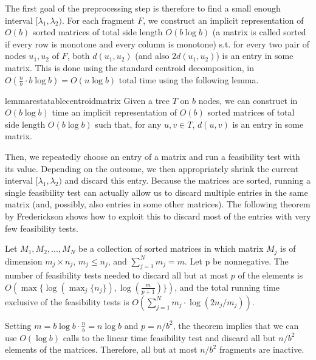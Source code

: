 \documentclass[a4paper,UKenglish]{lipics-v2016}
\theoremstyle{plain}
\begin{document}
The first goal of the preprocessing step is therefore to find a small enough interval $[\lambda_1,\lambda_2)$.
For each fragment $F$, we construct an implicit representation of $O(b)$ sorted matrices of total side length $O(b\log b)$
(a matrix is called sorted if every row is monotone and every column is monotone) s.t. for every two pair of nodes $u_1,u_2$ of $F$, both $d(u_1,u_2)$ (and also $2d(u_1,u_2)$) is an entry in some matrix. This is done using the standard centroid 
decomposition, in $O(\frac n b \cdot b\log b)=O(n\log b)$ total time using the following lemma. 
\begin{restatable}{lemmarestatable}{centroidmatrix}
Given a tree $T$ on $b$ nodes, we can construct in $O(b\log b)$ time an implicit representation of $O(b)$ sorted matrices of total
side length $O(b\log b)$ such that, for any $u,v\in T$, $d(u,v)$ is an entry in some matrix.
\end{restatable}
Then, we repeatedly choose an entry of a matrix and run a feasibility test with its value.  %
Depending on the outcome, we then appropriately shrink the current interval $[\lambda_{1},\lambda_{2})$ and discard this entry.
Because the matrices are sorted, running a single feasibility test can actually allow us to discard multiple entries in the same matrix
(and, possibly, also entries in some other matrices). The following theorem by Frederickson shows how to exploit this to discard most
of the entries with very few feasibility tests.

\begin{theorem}\label{Frederickson's theorem}
Let  ${M_1, M_2, . . . , M_N}$ be a collection of sorted matrices in which matrix $M_j$ is of dimension $m_j \times n_j$, $m_j \leq n_j$, and $\sum_{j=1}^{N} m_j = m$.
Let p be nonnegative. The number of feasibility tests needed to discard all but at most $p$ of the elements is $O(\max \lbrace \log(\max_{j} \lbrace n_j \rbrace), \log(\frac{m}{p+1}) \rbrace)$, and the total running time exclusive of the feasibility tests is $O(\sum_{j=1}^{N} m_j \cdot \log (2n_j/m_j))$.
\end{theorem}

Setting $m=b \log b \cdot \frac{n}{b} = n \log b$ and $p=n/b^2$, the theorem implies that we can use $O(\log b)$ calls to the linear time feasibility test and discard all but $n/b^2$ elements of the matrices. Therefore, all but at most $n/b^{2}$ fragments are inactive.
\end{document}
